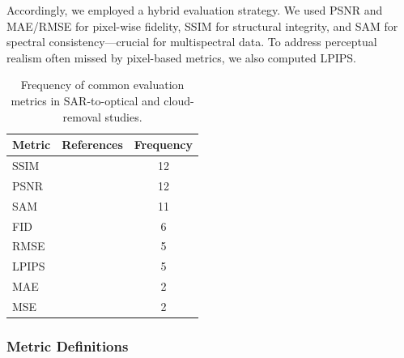 Accordingly, we employed a hybrid evaluation strategy. We used PSNR and MAE/RMSE for pixel-wise fidelity, SSIM for structural integrity, and SAM for spectral consistency—crucial for multispectral data. To address perceptual realism often missed by pixel-based metrics, we also computed LPIPS.

\begin{table}[H]
\centering
\caption{Frequency of common evaluation metrics in SAR-to-optical and cloud-removal studies.}
\label{tab:iqa}
\footnotesize
\begin{tabular}{l p{8cm} c}
\toprule
\textbf{Metric} & \textbf{References} & \textbf{Frequency} \\
\midrule
SSIM & \cite{CR_Advances_Review_ORS, RS_Data_Fusion_GANs_sota, DiffCR, c_diffusion_s2o, s2o_ViT_cGAN, S2MS_GAN, c_guided_fus_s2ot, transfusion_cr, trans_gan_CF, hvt_cgan, msf_gan, diffusion_memory} & 12 \\
PSNR & \cite{CR_Advances_Review_ORS, DiffCR, CR_RS_spati_atten_GAN, s2o_ViT_cGAN, CR_RS_GAN_s2o, S2MS_GAN, c_guided_fus_s2ot, transfusion_cr, trans_gan_CF, hvt_cgan, msf_gan, diffusion_memory} & 12 \\
SAM & \cite{A_cGAN_fuse_sar_MS_CR, RS_Data_Fusion_GANs_sota, CR_RS_GAN_s2o, S2MS_GAN, c_guided_fus_s2ot, transfusion_cr, trans_gan_CF, cond_brownian, hvt_cgan, msf_gan} & 11 \\
FID & \cite{DiffCR, c_diffusion_s2o, s2o_ViT_cGAN, cond_brownian, hvt_cgan, msf_gan} & 6 \\
RMSE & \cite{A_cGAN_fuse_sar_MS_CR, CR_Advances_Review_ORS, RS_Data_Fusion_GANs_sota, CR_RS_GAN_s2o, c_guided_fus_s2ot} & 5 \\
LPIPS  & \cite{CR_Advances_Review_ORS, DiffCR, S2MS_GAN, cond_brownian, diffusion_memory} & 5 \\
MAE & \cite{CR_RS_GAN_s2o, c_guided_fus_s2ot} & 2 \\
MSE & \cite{CR_RS_spati_atten_GAN, trans_gan_CF} & 2 \\
\bottomrule
\end{tabular}
\end{table}

\subsubsection{Metric Definitions}

